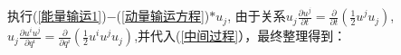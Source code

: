 \documentclass[LBMDerivation.tex]{subfiles}
\begin{document}


%





%


执行(\ref{能量输运1})$-$(\ref{动量输运方程})$*u_j$, 由于关系$u_j\frac{\partial u^j}{\partial t}=\frac{\partial}{\partial t}( \frac{1}{2}u^ju_j)$,$u_j\frac{\partial u^i u^j}{\partial q^i}=\frac{\partial}{\partial q^i}( \frac{1}{2}u^i u^ju_j)$,并代入(\ref{中间过程}），最终整理得到：



\end{document}
